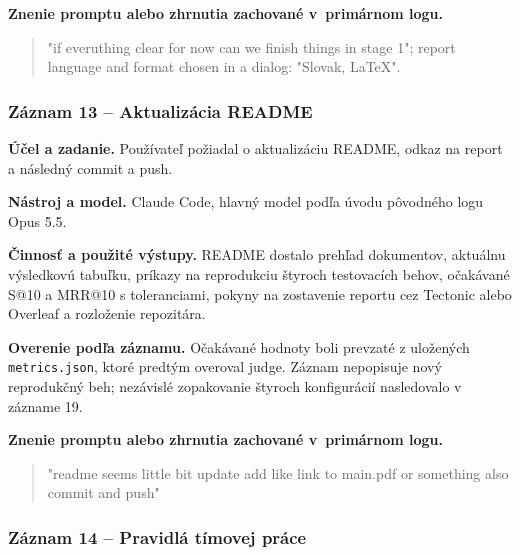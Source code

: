 \par\noindent\textbf{Znenie promptu alebo zhrnutia zachované v~primárnom logu.}

\begin{quote}\normalsize "if everuthing clear for now can we finish things in stage 1"; report language and format chosen in a dialog: "Slovak, LaTeX".\end{quote}

\subsubsection*{Záznam 13 -- Aktualizácia README}


\par\noindent \textbf{Účel a zadanie.} Používateľ požiadal o aktualizáciu README, odkaz na report a následný commit a push.\par\smallskip
\par\noindent \textbf{Nástroj a model.} Claude Code, hlavný model podľa úvodu pôvodného logu Opus 5.5.\par\smallskip
\par\noindent \textbf{Činnosť a použité výstupy.} README dostalo prehľad dokumentov, aktuálnu výsledkovú tabuľku, príkazy na reprodukciu štyroch testovacích behov, očakávané S@10 a MRR@10 s toleranciami, pokyny na zostavenie reportu cez Tectonic alebo Overleaf a rozloženie repozitára.\par\smallskip
\par\noindent \textbf{Overenie podľa záznamu.} Očakávané hodnoty boli prevzaté z uložených \texttt{metrics.\allowbreak{}json}, ktoré predtým overoval judge. Záznam nepopisuje nový reprodukčný beh; nezávislé zopakovanie štyroch konfigurácií nasledovalo v zázname 19.\par\smallskip

\par\noindent\textbf{Znenie promptu alebo zhrnutia zachované v~primárnom logu.}

\begin{quote}\normalsize "readme seems little bit update add like link to main.pdf or something also commit and push"\end{quote}

\subsubsection*{Záznam 14 -- Pravidlá tímovej práce}


